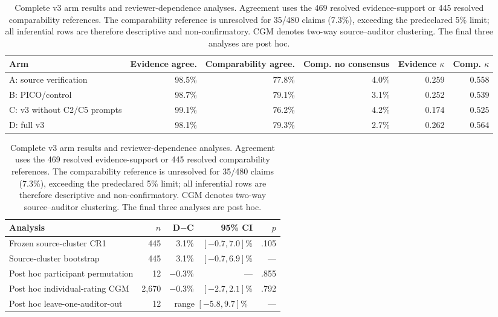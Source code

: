 \begin{table}[t]
\centering
\small
\setlength{\tabcolsep}{5pt}
\begin{tabular}{lrrrrr}
\toprule
\textbf{Arm} &
\textbf{Evidence agree.} &
\textbf{Comparability agree.} &
\textbf{Comp. no consensus} &
\textbf{Evidence $\kappa$} &
\textbf{Comp. $\kappa$} \\
\midrule
A: source verification & 98.5\% & 77.8\% & 4.0\% & 0.259 & 0.558 \\
B: PICO/control & 98.7\% & 79.1\% & 3.1\% & 0.252 & 0.539 \\
C: v3 without C2/C5 prompts & 99.1\% & 76.2\% & 4.2\% & 0.174 & 0.525 \\
D: full v3 & 98.1\% & 79.3\% & 2.7\% & 0.262 & 0.564 \\
\bottomrule
\end{tabular}

\vspace{4pt}
\begin{tabularx}{\linewidth}{>{\raggedright\arraybackslash}Xrrrr}
\toprule
\textbf{Analysis} & \textbf{$n$} & \textbf{D$-$C} &
\textbf{95\% CI} & \textbf{$p$} \\
\midrule
Frozen source-cluster CR1 & 445 & 3.1\% & $[-0.7,7.0]$\% & .105 \\
Source-cluster bootstrap & 445 & 3.1\% & $[-0.7,6.9]$\% & --- \\
Post hoc participant permutation & 12 & $-0.3$\% & --- & .855 \\
Post hoc individual-rating CGM & 2{,}670 & $-0.3$\% & $[-2.7,2.1]$\% & .792 \\
Post hoc leave-one-auditor-out & 12 & \multicolumn{2}{c}{range $[-5.8,9.7]$\%} & --- \\
\bottomrule
\end{tabularx}
\caption{Complete v3 arm results and reviewer-dependence analyses.
Agreement uses the 469 resolved evidence-support or 445 resolved comparability
references. The comparability reference is unresolved for 35/480 claims
(7.3\%), exceeding the predeclared 5\% limit; all inferential rows are
therefore descriptive and non-confirmatory. CGM denotes two-way
source--auditor clustering. The final three analyses are post hoc.}
\label{tab:main-v3-followup}
\end{table}
